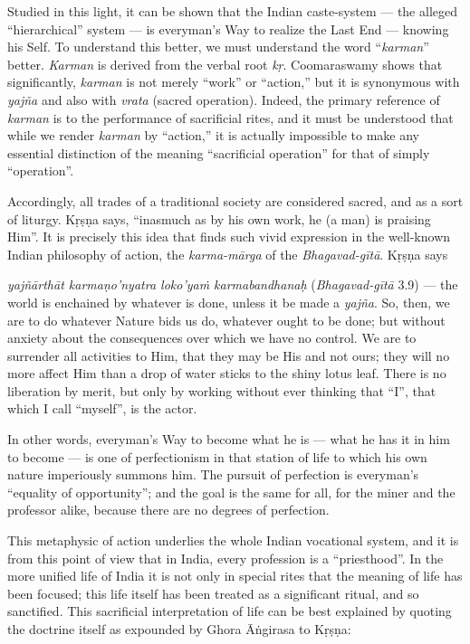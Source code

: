 Studied in this light, it can be shown that the Indian caste-system --- the alleged “hierarchical” system --- is everyman’s Way to realize the Last End --- knowing his Self. To understand this better, we must understand the word “{\sl karman}” better. {\sl Karman} is derived from the verbal root {\sl kṛ}. Coomaraswamy shows that significantly, {\sl karman} is not merely “work” or “action,” but it is synonymous with {\sl yajña} and also with {\sl vrata} (sacred operation). Indeed, the primary reference of {\sl karman} is to the performance of sacrificial rites, and it must be understood that while we render {\sl karman} by “action,” it is actually impossible to make any essential distinction of the meaning “sacrificial operation” for that of simply “operation”.

Accordingly, all trades of a traditional society are considered sacred, and as a sort of liturgy. Kṛṣṇa says, “inasmuch as by his own work, he (a man) is praising Him”. It is precisely this idea that finds such vivid expression in the well-known Indian philosophy of action, the {\sl karma-mārga} of the {\sl Bhagavad-gītā}. Kṛṣṇa says 


{\sl yajñārthāt karmaṇo’nyatra loko’yaṁ karmabandhanaḥ} ({\sl Bhagavad-gītā} 3.9) --- the world is enchained by whatever is done, unless it be made a {\sl yajña}. So, then, we are to do whatever Nature bids us do, whatever ought to be done; but without anxiety about the consequences over which we have no control. We are to surrender all activities to Him, that they may be His and not ours; they will no more affect Him than a drop of water sticks to the shiny lotus leaf. There is no liberation by merit, but only by working without ever thinking that “I”, that which I call “myself”, is the actor. 

In other words, everyman’s Way to become what he is --- what he has it in him to become --- is one of perfectionism in that station of life to which his own nature imperiously summons him. The pursuit of perfection is everyman’s “equality of opportunity”; and the goal is the same for all, for the miner and the professor alike, because there are no degrees of perfection. 

This metaphysic of action underlies the whole Indian vocational system, and it is from this point of view that in India, every profession is a “priesthood”. In the more unified life of India it is not only in special rites that the meaning of life has been focused; this life itself has been treated as a significant ritual, and so sanctified. This sacrificial interpretation of life can be best explained by quoting the doctrine itself as expounded by Ghora Āṅgirasa to Kṛṣṇa: 

